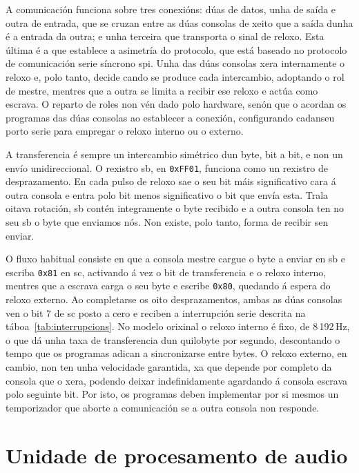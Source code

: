 A comunicación funciona sobre tres conexións:
dúas de datos, unha de saída e outra de entrada, que se cruzan entre as dúas consolas
de xeito que a saída dunha é a entrada da outra;
e unha terceira que transporta o sinal de reloxo.
Esta última é a que establece a asimetría do protocolo,
que está baseado no protocolo de comunicación serie síncrono \acrfull{spi}.
Unha das dúas consolas xera internamente o reloxo e, polo tanto, decide cando se produce
cada intercambio, adoptando o rol de mestre, mentres que a outra se limita a recibir
ese reloxo e actúa como escrava.
O reparto de roles non vén dado polo hardware, senón que o acordan os programas
das dúas consolas ao establecer a conexión, configurando cadanseu porto serie
para empregar o reloxo interno ou o externo.


A transferencia é sempre un intercambio simétrico dun byte, bit a bit,
e non un envío unidireccional.
O rexistro \acrfull{sb}, en \texttt{0xFF01},
funciona como un rexistro de desprazamento.
En cada pulso de reloxo sae o seu bit máis significativo cara á outra consola
e entra polo bit menos significativo o bit que envía esta.
Trala oitava rotación, \acrshort{sb} contén integramente o byte recibido
e a outra consola ten no seu \acrshort{sb} o byte que enviamos nós.
Non existe, polo tanto, forma de recibir sen enviar.



O fluxo habitual consiste en que a consola mestre cargue o byte a enviar en \acrshort{sb}
e escriba \texttt{0x81} en \acrshort{sc}, activando á vez o bit de transferencia
e o reloxo interno, mentres que a escrava carga o seu byte e escribe \texttt{0x80},
quedando á espera do reloxo externo.
Ao completarse os oito desprazamentos, ambas as dúas consolas ven o bit 7 de \acrshort{sc}
posto a cero e reciben a interrupción serie descrita na táboa~\ref{tab:interrupcions}.
No modelo orixinal o reloxo interno é fixo, de 8\,192\,Hz,
o que dá unha taxa de transferencia dun quilobyte por segundo,
descontando o tempo que os programas adican a sincronizarse entre bytes.
O reloxo externo, en cambio, non ten unha velocidade garantida,
xa que depende por completo da consola que o xera, podendo deixar indefinidamente agardando á consola escrava polo seguinte bit.
Por isto, os programas deben implementar por si mesmos un temporizador
que aborte a comunicación se a outra consola non responde.

\section{Unidade de procesamento de audio}
\label{sec:apu}

